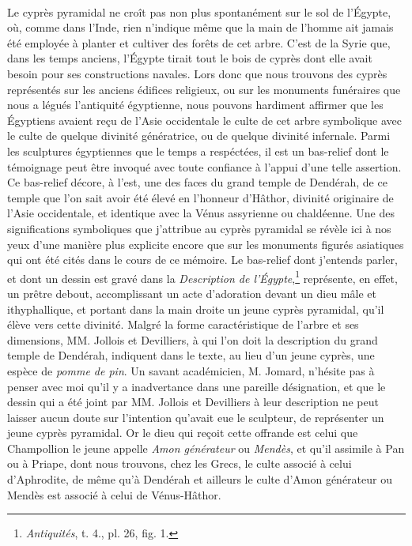\documentclass[a4paper, 11pt, oneside, polutonikogreek, french]{article}
\begin{document}
\paragraph{}
Le cyprès pyramidal ne croît pas non plus spontanément sur le sol de l'Égypte, où, comme dans l'Inde, rien n'indique même que la main de l'homme ait jamais été employée à planter et cultiver des forêts de cet arbre. C'est de la Syrie que, dans les temps anciens, l'Égypte tirait tout le bois de cyprès dont elle avait besoin pour ses constructions navales. Lors donc que nous trouvons des cyprès représentés sur les anciens édifices religieux, ou sur les monuments funéraires que nous a légués l'antiquité égyptienne, nous pouvons hardiment affirmer que les Égyptiens avaient reçu de l'Asie occidentale le culte de cet arbre symbolique avec le culte de quelque divinité génératrice, ou de quelque divinité infernale. Parmi les sculptures égyptiennes que le temps a respéctées, il est un bas-relief dont le témoignage peut être invoqué avec toute confiance à l'appui d'une telle assertion. Ce bas-relief décore, à l'est, une des faces du grand temple de Dendérah, de ce temple que l'on sait avoir été élevé en l'honneur d'Hâthor, divinité originaire de l'Asie occidentale, et identique avec la Vénus assyrienne ou chaldéenne. Une des significations symboliques que j'attribue au cyprès pyramidal se révèle ici à nos yeux d'une manière plus explicite encore que sur les monuments figurés asiatiques qui ont été cités dans le cours de ce mémoire. Le bas-relief dont j'entends parler, et dont un dessin est gravé dans la \emph{Description de l'Égypte},\footnote{\emph{Antiquités}, t. 4., pl. 26, fig. 1.} représente, en effet, un prêtre debout, accomplissant un acte d'adoration devant un dieu mâle et ithyphallique, et portant dans la main droite un jeune cyprès pyramidal, qu'il élève vers cette divinité. Malgré la forme caractéristique de l'arbre et ses dimensions, MM. Jollois et Devilliers, à qui l'on doit la description du grand temple de Dendérah, indiquent dans le texte, au lieu d'un jeune cyprès, une espèce de \emph{pomme de pin}. Un savant académicien, M. Jomard, n'hésite pas à penser avec moi qu'il y a inadvertance dans une pareille désignation, et que le dessin qui a été joint par MM. Jollois et Devilliers à leur description ne peut laisser aucun doute sur l'intention qu'avait eue le sculpteur, de représenter un jeune cyprès pyramidal. Or le dieu qui reçoit cette offrande est celui que Champollion le jeune appelle \emph{Amon générateur} ou \emph{Mendès}, et qu'il assimile à Pan ou à Priape, dont nous trouvons, chez les Grecs, le culte associé à celui d'Aphrodite, de même qu'à Dendérah et ailleurs le culte d'Amon générateur ou Mendès est associé à celui de Vénus-Hâthor.
\end{document}
